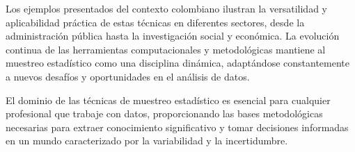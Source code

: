Los ejemplos presentados del contexto colombiano ilustran la versatilidad y aplicabilidad práctica de estas técnicas en diferentes sectores, desde la administración pública hasta la investigación social y económica. La evolución continua de las herramientas computacionales y metodológicas mantiene al muestreo estadístico como una disciplina dinámica, adaptándose constantemente a nuevos desafíos y oportunidades en el análisis de datos.

\begin{remark}
El dominio de las técnicas de muestreo estadístico es esencial para cualquier profesional que trabaje con datos, proporcionando las bases metodológicas necesarias para extraer conocimiento significativo y tomar decisiones informadas en un mundo caracterizado por la variabilidad y la incertidumbre.
\end{remark}
